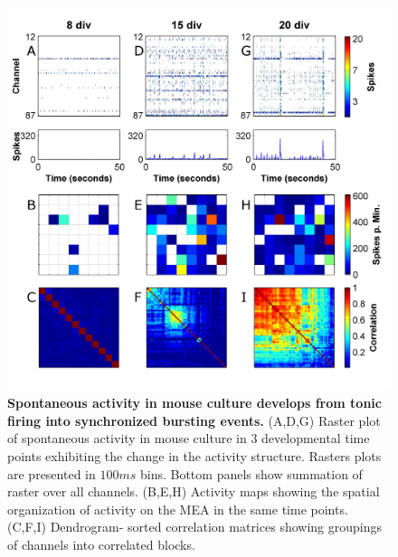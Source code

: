         \begin{figure}[!htb]
            \centering
            \includegraphics[width=15cm]{chapter3/figures/devExample/devActivity.jpg}

            \caption[Development of synchrony in the spontaneous activity of a representative mouse culture]{\textbf{Spontaneous activity in mouse culture develops from tonic firing into synchronized bursting events.} (A,D,G) Raster plot of spontaneous activity in mouse culture in 3 developmental time points exhibiting the change in the activity structure. Rasters plots are presented in \(100 ms\) bins. Bottom panels show summation of raster over all channels. (B,E,H) Activity maps showing the spatial organization of activity on the MEA in the same time points. (C,F,I) Dendrogram- sorted correlation matrices showing groupings of channels into correlated blocks.}
            \label{fig:activity:devExample}
        \end{figure}



